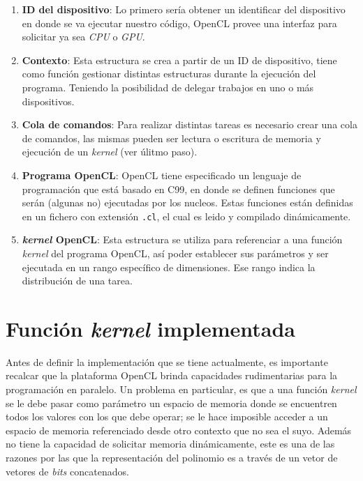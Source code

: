 \begin{enumerate}
    \item \textbf{ID del dispositivo}: Lo primero sería obtener un identificar del dispositivo en donde se va ejecutar nuestro código, OpenCL provee una interfaz para solicitar ya sea \textit{CPU} o \textit{GPU}.

    \item \textbf{Contexto}: Esta estructura se crea a partir de un ID de dispositivo, tiene como función gestionar distintas estructuras durante la ejecución del programa. Teniendo la posibilidad de delegar trabajos en uno o más dispositivos.

    \item \textbf{Cola de comandos}: Para realizar distintas tareas es necesario crear una cola de comandos, las mismas pueden ser lectura o escritura de memoria y ejecución de un \textit{kernel} (ver úlitmo paso).

    \item \textbf{Programa OpenCL}: OpenCL tiene especificado un lenguaje de programación que está basado en C99, en donde se definen funciones que serán (algunas no) ejecutadas por los nucleos. Estas funciones están definidas en un fichero con extensión \texttt{.cl}, el cual es leido y compilado dinámicamente.

    \item \textbf{\textit{kernel} OpenCL}: Esta estructura se utiliza para referenciar a una función \textit{kernel} del programa OpenCL, así poder establecer sus parámetros y ser ejecutada en un rango específico de dimensiones. Ese rango indica la distribución de una tarea.
\end{enumerate}

\section{Función \textit{kernel} implementada}

Antes de definir la implementación que se tiene actualmente, es importante recalcar que la plataforma OpenCL brinda capacidades rudimentarias para la programación en paralelo. Un problema en particular, es que a una función \textit{kernel} se le debe pasar como parámetro un espacio de memoria donde se encuentren todos los valores con los que debe operar; se le hace imposible acceder a un espacio de memoria referenciado desde otro contexto que no sea el suyo. Además no tiene la capacidad de solicitar memoria dinámicamente, este es una de las razones por las que la representación del polinomio es a través de un vetor de vetores de \textit{bits} concatenados.


